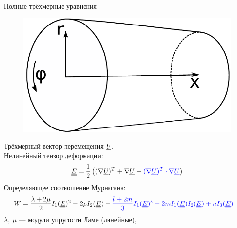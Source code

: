 \documentclass[usenames,dvipsnames]{beamer}
\DeclareMathOperator{\trace}{tr}
\newcommand{\lb}{\left (}
\newcommand{\rb}{\right )}
\newcommand{\vect}[1]{\underline{#1}}
\newcommand{\tens}[1]{\underline{\underline{#1}}}
\begin{document}
\begin{frame}{Полные трёхмерные уравнения}
\begin{figure}
	\vspace{-2mm}
	\includegraphics[width=\linewidth]{figures/1_RodSchematic}
\end{figure}
Трёхмерный вектор перемещения $\color{black}\vect{U}$.\\
\vspace{1mm}
Нелинейный тензор деформации:
\begin{equation*}
\tens{E} = \frac12 \lb(\nabla\vect{U})^T + \nabla\vect{U} + {\color{blue}(\nabla\vect{U})^T\cdot\nabla\vect{U}}\rb
\end{equation*}
Определяющее соотношение Мурнагана:
\small
\begin{align*}
&W = \frac{\lambda + 2\mu}{2}I_1(\tens{E})^2 - 2\mu I_2(\tens{E}) +\color{blue} \frac{l+2m}{3}I_1(\tens{E})^3 - 2m I_1(\tens{E}) I_2(\tens{E}) + n I_3(\tens{E})
\end{align*}
$\lambda,\ \mu$ --- модули упругости Ламе (линейные),\\

\end{frame}
\end{document}
